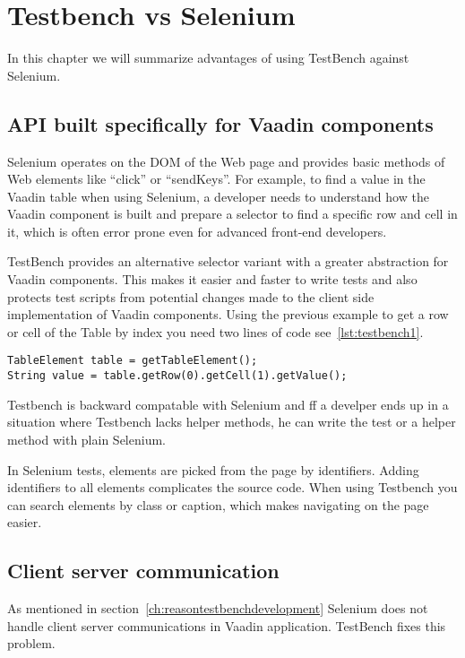 \chapter{Testbench vs Selenium}
\label{ch:testbenchvsselenium}
In this chapter we will summarize advantages of using TestBench against
Selenium.

\section{API built specifically for Vaadin components}
Selenium operates on the DOM of the Web page and provides basic methods of
Web elements like ``click'' or ``sendKeys''. For example, to find a value in the Vaadin table
 when using Selenium, a developer needs to understand how the Vaadin component
 is built and prepare a selector to find a specific row and cell in it, which is often error prone even for advanced front-end developers.
 
TestBench provides an alternative selector variant with a greater abstraction for Vaadin components.
This makes it easier and faster to write tests and also protects test scripts
from potential changes made to the client side implementation of Vaadin components.
 Using the previous example to get a row or cell of the Table by index you need two lines of code
 see~\ref{lst:testbench1}.
    \lstset{style=a1listing}
    \begin{lstlisting}[caption=Get Vaadin Table cell Value,label={lst:testbench1}]
TableElement table = getTableElement();
String value = table.getRow(0).getCell(1).getValue();
  \end{lstlisting}

Testbench is backward compatable with Selenium and ff a develper ends up in a
situation where Testbench lacks helper methods, he can write the test or a helper method with plain Selenium.

In Selenium tests, elements are picked from the page by identifiers.
Adding identifiers to all elements complicates the source code. When using Testbench you can
search elements by class or caption, which makes navigating on the page easier.
	
\section{Client server communication}
As mentioned in section~\ref{ch:reasontestbenchdevelopment}
Selenium does not handle client server communications in Vaadin
application. TestBench fixes this problem.

